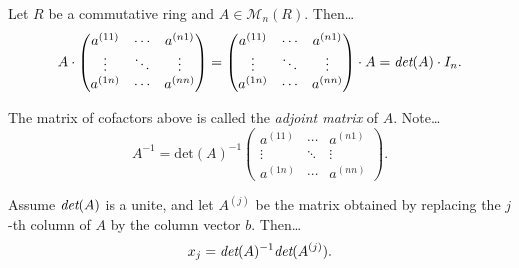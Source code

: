 \begin{corollary}
Let $R$ be a commutative ring and $A \in \mathcal{M}_n(R)$. Then\dots
\[
A \cdot \begin{pmatrix}
	a^{(11)} & \cdots & a^{(n1)}\\
	\vdots & \ddots & \vdots\\
	a^{(1n)} & \cdots & a^{(nn)}
\end{pmatrix} =
\begin{pmatrix}
	a^{(11)} & \cdots & a^{(n1)}\\
	\vdots & \ddots & \vdots\\
	a^{(1n)} & \cdots & a^{(nn)}
\end{pmatrix} \cdot A =
\emph{det}(A)\cdot I_n.
\]
\end{corollary}
\noindent The matrix of cofactors above is called the \emph{adjoint matrix} of $A$. Note\dots
\[
A^{-1} = \textrm{det}(A)^{-1}
\begin{pmatrix}
	a^{(11)} & \cdots & a^{(n1)}\\
	\vdots & \ddots & \vdots\\
	a^{(1n)} & \cdots & a^{(nn)}
\end{pmatrix}.
\]

\begin{proposition}
\label{cramersrule}
Assume $\emph{det}(A)$ is a unite, and let $A^{(j)}$ be the matrix obtained by replacing the $j$-th column of $A$ by the
column vector $b$. Then\dots
$$x_j = \emph{det}(A)^{-1}\emph{det}(A^{(j)}).$$
\end{proposition}